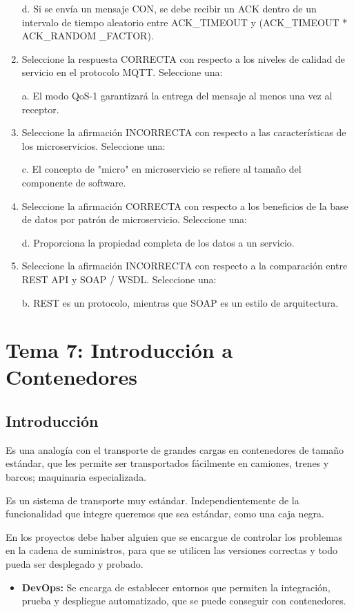 \documentclass[12pt, twoside, openright]{report} %
\begin{document}
\begin{enumerate}
	      d. Si se envía un mensaje CON, se debe recibir un ACK dentro de un intervalo de tiempo aleatorio entre ACK\_TIMEOUT y (ACK\_TIMEOUT * ACK\_RANDOM \_FACTOR).

	\item Seleccione la respuesta CORRECTA con respecto a los niveles de calidad de servicio en el protocolo MQTT.	Seleccione una:

	      a. El modo QoS-1 garantizará la entrega del mensaje al menos una vez al receptor.

	\item Seleccione la afirmación INCORRECTA con respecto a las características de los microservicios. Seleccione una:

	      c. El concepto de "micro" en microservicio se refiere al tamaño del componente de software.

	\item Seleccione la afirmación CORRECTA con respecto a los beneficios de la base de datos por patrón de microservicio. Seleccione una:

	      d. Proporciona la propiedad completa de los datos a un servicio.
	\item Seleccione la afirmación INCORRECTA con respecto a la comparación entre REST API y SOAP / WSDL. 	Seleccione una:

	      b. REST es un protocolo, mientras que SOAP es un estilo de arquitectura.
\end{enumerate}

\chapter{Tema 7: Introducción a Contenedores}
\section{Introducción}
Es una analogía con el transporte de grandes cargas en contenedores de tamaño estándar, que les permite ser transportados fácilmente en camiones, trenes y barcos; maquinaria especializada.

Es un sistema de transporte muy estándar. Independientemente de la funcionalidad que integre queremos que sea estándar, como una caja negra.

En los proyectos debe haber alguien que se encargue de controlar los problemas en la cadena de suministros, para que se utilicen las versiones correctas y todo pueda ser desplegado y probado.
\begin{itemize}
	\item \textbf{DevOps:} Se encarga de establecer entornos que permiten la integración, prueba y despliegue automatizado, que se puede conseguir con contenedores.
\end{itemize}
\end{document}
